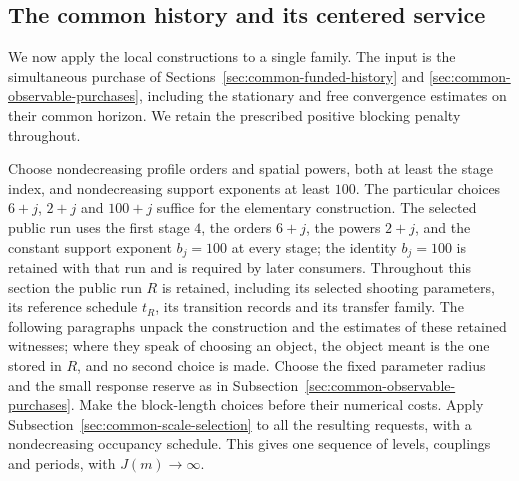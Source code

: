 \subsection{The common history and its centered service}
\label{sec:selected-centered-service}
We now apply the local constructions to a single family. The input is
the simultaneous purchase of
Sections~\ref{sec:common-funded-history} and
\ref{sec:common-observable-purchases}, including the stationary and
free convergence estimates on their common horizon. We retain the
prescribed positive blocking penalty throughout.

Choose nondecreasing profile orders and spatial powers, both at least the
stage index, and nondecreasing support exponents at least $100$. The
particular choices $6+j$, $2+j$ and $100+j$ suffice for the elementary
construction. The selected public run uses the first stage $4$, the
orders $6+j$, the powers $2+j$, and the constant support exponent
$b_j=100$ at every stage; the identity $b_j=100$ is retained with that
run and is required by later consumers. Throughout this section the
public run $R$ is retained, including its selected shooting parameters,
its reference schedule $t_R$, its transition records and its transfer
family. The following paragraphs unpack the construction and the
estimates of these retained witnesses; where they speak of choosing an
object, the object meant is the one stored in $R$, and no second choice
is made. Choose the fixed parameter radius and the small response reserve
as in Subsection~\ref{sec:common-observable-purchases}. Make the block-length
choices before their numerical costs. Apply
Subsection~\ref{sec:common-scale-selection} to all the resulting requests,
with a nondecreasing occupancy schedule. This gives one sequence of
levels, couplings and periods, with $J(m)\to\infty$.

